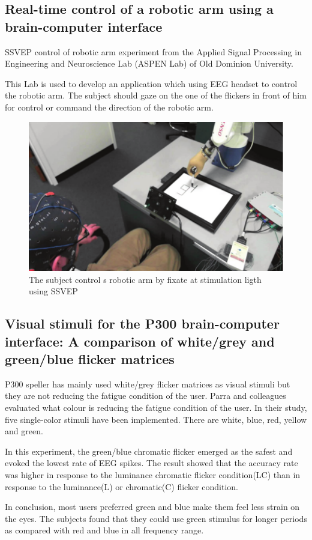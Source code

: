 \subsection {Real-time control of a robotic arm using a brain-computer interface\cite{ref2}}

\hspace{1.5cm} SSVEP control of robotic arm experiment from the Applied Signal Processing in Engineering and Neuroscience Lab (ASPEN Lab) of Old Dominion University.\par
This Lab is used to develop an application which using EEG headset to control the robotic arm. The subject should gaze on the one of the flickers in front of him for control or command the direction of the robotic arm.
\begin{figure}[h]
	\centering
  	\includegraphics[scale = 0.70]{chapter2/22.pdf}
  	\caption{The subject control s robotic arm by fixate at stimulation ligth using SSVEP}
\end{figure}
\newpage

\subsection {Visual stimuli for the P300 brain-computer interface: A comparison of white/grey and green/blue flicker matrices\cite{ref3}}

\hspace{1.5cm}  P300 speller has mainly used white/grey flicker matrices as visual stimuli but they are not reducing the fatigue condition of the user. Parra and colleagues evaluated what colour is reducing the fatigue condition of the user. In their study, five single-color stimuli have been implemented. There are white, blue, red, yellow and green.\par
In this experiment, the green/blue chromatic flicker emerged as the safest and evoked the lowest rate of EEG spikes. The result showed that the accuracy rate was higher in response to the luminance chromatic flicker condition(LC) than in response to the luminance(L) or chromatic(C) flicker condition.\par
In conclusion, most users preferred green and blue make them feel less strain on the eyes. The subjects found that they could use green stimulus for longer periods as compared with red and blue in all frequency range.

